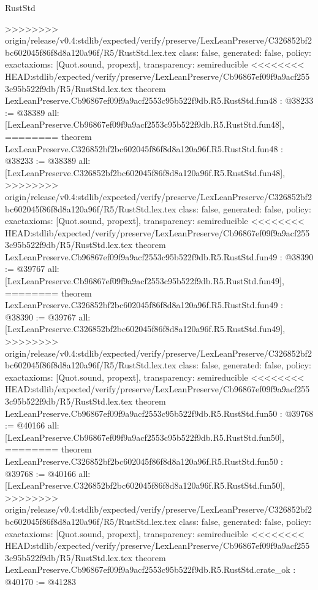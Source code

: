 \begin{lexlean}{RustStd}
\begin{coremodule}
{\begin{coremodule}
{{{{{{{{{{{{{{{{{{{{{{{{{{{{{{{{{{{{{{{{{{{{{{{{{{{>>>>>>>> origin/release/v0.4:stdlib/expected/verify/preserve/LexLeanPreserve/C326852bf2bc602045f86f8d8a120a96f/R5/RustStd.lex.tex
  class: false,
  generated: false,
  policy: exact{axioms: [Quot.sound, propext]},
  transparency: semireducible
}
<<<<<<<< HEAD:stdlib/expected/verify/preserve/LexLeanPreserve/Cb96867ef09f9a9acf2553c95b522f9db/R5/RustStd.lex.tex
theorem LexLeanPreserve.Cb96867ef09f9a9acf2553c95b522f9db.R5.RustStd.fun48 : @38233 := @38389 {
  all: [LexLeanPreserve.Cb96867ef09f9a9acf2553c95b522f9db.R5.RustStd.fun48],
========
theorem LexLeanPreserve.C326852bf2bc602045f86f8d8a120a96f.R5.RustStd.fun48 : @38233 := @38389 {
  all: [LexLeanPreserve.C326852bf2bc602045f86f8d8a120a96f.R5.RustStd.fun48],
>>>>>>>> origin/release/v0.4:stdlib/expected/verify/preserve/LexLeanPreserve/C326852bf2bc602045f86f8d8a120a96f/R5/RustStd.lex.tex
  class: false,
  generated: false,
  policy: exact{axioms: [Quot.sound, propext]},
  transparency: semireducible
}
<<<<<<<< HEAD:stdlib/expected/verify/preserve/LexLeanPreserve/Cb96867ef09f9a9acf2553c95b522f9db/R5/RustStd.lex.tex
theorem LexLeanPreserve.Cb96867ef09f9a9acf2553c95b522f9db.R5.RustStd.fun49 : @38390 := @39767 {
  all: [LexLeanPreserve.Cb96867ef09f9a9acf2553c95b522f9db.R5.RustStd.fun49],
========
theorem LexLeanPreserve.C326852bf2bc602045f86f8d8a120a96f.R5.RustStd.fun49 : @38390 := @39767 {
  all: [LexLeanPreserve.C326852bf2bc602045f86f8d8a120a96f.R5.RustStd.fun49],
>>>>>>>> origin/release/v0.4:stdlib/expected/verify/preserve/LexLeanPreserve/C326852bf2bc602045f86f8d8a120a96f/R5/RustStd.lex.tex
  class: false,
  generated: false,
  policy: exact{axioms: [Quot.sound, propext]},
  transparency: semireducible
}
<<<<<<<< HEAD:stdlib/expected/verify/preserve/LexLeanPreserve/Cb96867ef09f9a9acf2553c95b522f9db/R5/RustStd.lex.tex
theorem LexLeanPreserve.Cb96867ef09f9a9acf2553c95b522f9db.R5.RustStd.fun50 : @39768 := @40166 {
  all: [LexLeanPreserve.Cb96867ef09f9a9acf2553c95b522f9db.R5.RustStd.fun50],
========
theorem LexLeanPreserve.C326852bf2bc602045f86f8d8a120a96f.R5.RustStd.fun50 : @39768 := @40166 {
  all: [LexLeanPreserve.C326852bf2bc602045f86f8d8a120a96f.R5.RustStd.fun50],
>>>>>>>> origin/release/v0.4:stdlib/expected/verify/preserve/LexLeanPreserve/C326852bf2bc602045f86f8d8a120a96f/R5/RustStd.lex.tex
  class: false,
  generated: false,
  policy: exact{axioms: [Quot.sound, propext]},
  transparency: semireducible
}
<<<<<<<< HEAD:stdlib/expected/verify/preserve/LexLeanPreserve/Cb96867ef09f9a9acf2553c95b522f9db/R5/RustStd.lex.tex
theorem LexLeanPreserve.Cb96867ef09f9a9acf2553c95b522f9db.R5.RustStd.crate_ok : @40170 := @41283 {
}}}}}}}}}}}}}}}}}}}}}}}}}}}}}}}}}}}}}}}}}}}}}}}}}}}}}}
\end{coremodule}}
\end{coremodule}
\end{lexlean}
